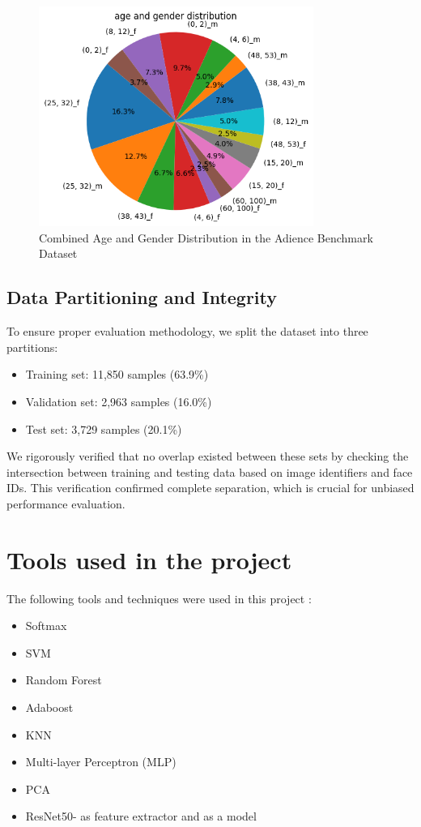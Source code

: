 \documentclass{article}
\begin{document}
\begin{figure}[H]
    \centering
    \includegraphics[width=0.8\textwidth]{assets/age and gender distribution.png}
    \caption{Combined Age and Gender Distribution in the Adience Benchmark Dataset}
\end{figure}

\subsection{Data Partitioning and Integrity}

To ensure proper evaluation methodology, we split the dataset into three partitions:

\begin{itemize}
    \item Training set: 11,850 samples (63.9\%)
    \item Validation set: 2,963 samples (16.0\%)
    \item Test set: 3,729 samples (20.1\%)
\end{itemize}

We rigorously verified that no overlap existed between these sets by checking the intersection between training and testing data based on image identifiers and face IDs. This verification confirmed complete separation, which is crucial for unbiased performance evaluation.

\section*{Tools used in the project}

The following tools and techniques were used in this project :

\begin{itemize}
    \item Softmax
    \item SVM
    \item Random Forest
    \item Adaboost
    \item KNN
    \item Multi-layer Perceptron (MLP)
    \item PCA 
    \item ResNet50- as feature extractor and as a model
\end{itemize}
\end{document}

